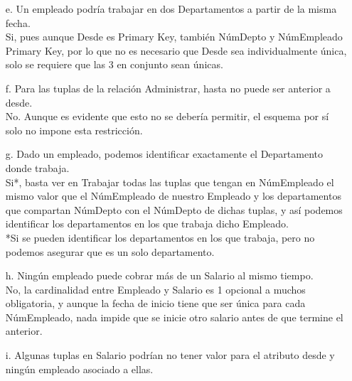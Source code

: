 \documentclass[12pt,a4paper]{article}
\begin{document}
\begin{enumerate}
\begin{enumerate}
            \item[e.] Un empleado podría trabajar en dos Departamentos a partir de la misma fecha.\\
            
            Si, pues aunque Desde es Primary Key, también NúmDepto y NúmEmpleado Primary Key, por lo que no es necesario que Desde sea individualmente única, solo se requiere que las 3 en conjunto sean únicas.\\
            
            \item[f.] Para las tuplas de la relación Administrar, hasta no puede ser anterior a desde.\\
            
            No. Aunque es evidente que esto no se debería permitir, el esquema por sí solo no impone esta restricción.\\
            
            \item[g.] Dado un empleado, podemos identificar exactamente el Departamento donde trabaja.\\
            
            Si*, basta ver en Trabajar todas las tuplas que tengan en NúmEmpleado el mismo valor que el NúmEmpleado de nuestro Empleado y los departamentos que compartan NúmDepto con el NúmDepto de dichas tuplas, y así podemos identificar los departamentos en los que trabaja dicho Empleado. \\
            *Si se pueden identificar los departamentos en los que trabaja, pero no podemos asegurar que es un solo departamento.\\
            
            \item[h.] Ningún empleado puede cobrar más de un Salario al mismo tiempo.\\
        
            No, la cardinalidad entre Empleado y Salario es 1 opcional a muchos obligatoria, y aunque la fecha de inicio tiene que ser única para cada NúmEmpleado, nada impide que se inicie otro salario antes de que termine el anterior. \\
            
            \item[i.] Algunas tuplas en Salario podrían no tener valor para el atributo desde
                y ningún empleado asociado a ellas.\\
            

\end{enumerate}
\end{enumerate}
\end{document}
